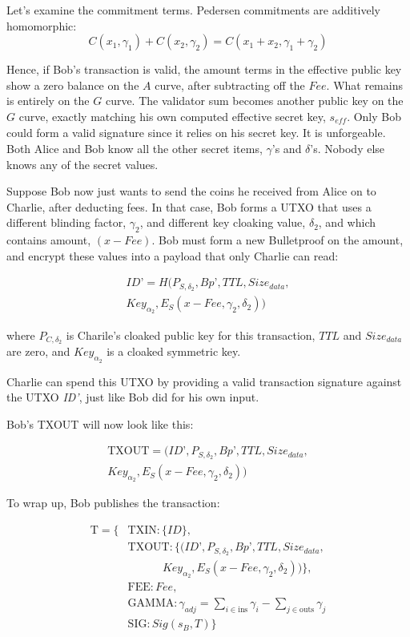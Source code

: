 \documentclass[8pt,fleqn,openany]{book}
\begin{document}
Let’s examine the commitment terms. Pedersen commitments are additively homomorphic:
$$C(x_1, \gamma_1) + C(x_2, \gamma_2) = C(x_1 + x_2, \gamma_1 + \gamma_2)$$

Hence, if Bob’s transaction is valid, the amount terms in the effective public key show a zero balance on the $A$ curve, after subtracting off the $\mathit{Fee}$. What remains is entirely on the $G$ curve. The validator sum becomes another public key on the $G$ curve, exactly matching his own computed effective secret key, $s_{\mathit{eff}}$. Only Bob could form a valid signature since it relies on his secret key. It is unforgeable. Both Alice and Bob know all the other secret items, $\gamma$’s and $\delta$’s. Nobody else knows any of the secret values.

Suppose Bob now just wants to send the coins he received from Alice on to Charlie, after deducting fees. In that case, Bob forms a UTXO that uses a different blinding factor, $\gamma_2$, and different key cloaking value, $\delta_2$, and which contains amount, $(x - \mathit{Fee})$. Bob must form a new Bulletproof on the amount, and encrypt these values into a payload that only Charlie can read:

\begin{multline*}
ID’ = H(P_{S, \delta_2}, Bp’, TTL, Size_{data}, \\
          Key_{\alpha_2}, E_S(x - Fee, \gamma_2, \delta_2))
\end{multline*}

where $P_{C, \delta_2}$ is Charile’s cloaked public key for this transaction, $TTL$ and $Size_{data}$ are zero, and $Key_{\alpha_2}$ is a cloaked symmetric key. 

Charlie can spend this UTXO by providing a valid transaction signature against the UTXO \textit{ID’}, just like Bob did for his own input. 

Bob’s TXOUT will now look like this:

\begin{multline*}
\text{TXOUT} = (ID’, P_{S, \delta_2}, Bp’, TTL, Size_{data},\\ 
                Key_{\alpha_2}, E_S(x - Fee, \gamma_2, \delta_2))
\end{multline*}

To wrap up, Bob publishes the transaction:

\begin{align*}
\text{T} = \{&\text{TXIN} : \{\mathit{ID}\}, \\
 &\text{TXOUT} : \{(ID’, P_{S, \delta_2}, Bp’, TTL, Size_{data}, \\
 & \ \ \ \ \ \ \ \ \ \ \ \ \ \ Key_{\alpha_2}, E_S(x - Fee, \gamma_2, \delta_2))\}, \\
 &\text{FEE} : \mathit{Fee}, \\
 &\text{GAMMA} : \gamma_{\mathit{adj}} = \sum_{i \in \text{ins}}{\gamma_i} - \sum_{j \in \text{outs}}{\gamma_j}\\
 &\text{SIG} : \mathit{Sig}(s_B, T)\}
\end{align*}
\end{document}
